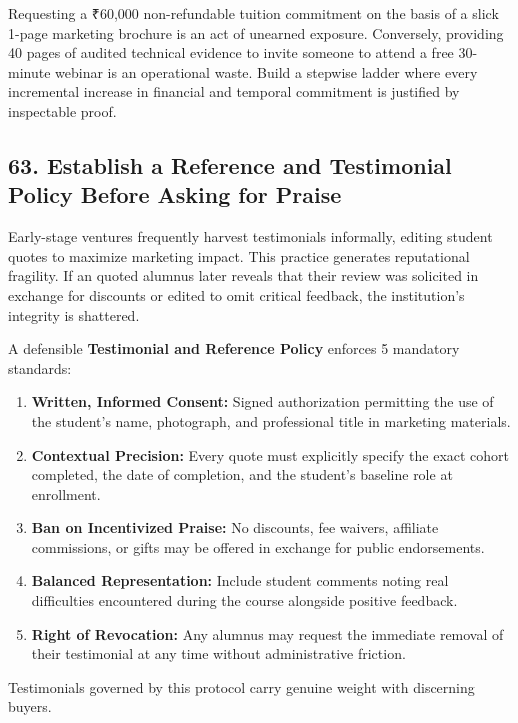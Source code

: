 Requesting a ₹60,000 non-refundable tuition commitment on the basis of a slick 1-page marketing brochure is an act of unearned exposure. Conversely, providing 40 pages of audited technical evidence to invite someone to attend a free 30-minute webinar is an operational waste. Build a stepwise ladder where every incremental increase in financial and temporal commitment is justified by inspectable proof.

\subsection*{63. Establish a Reference and Testimonial Policy Before Asking for Praise}

Early-stage ventures frequently harvest testimonials informally, editing student quotes to maximize marketing impact. This practice generates reputational fragility. If an quoted alumnus later reveals that their review was solicited in exchange for discounts or edited to omit critical feedback, the institution's integrity is shattered.

A defensible \textbf{Testimonial and Reference Policy} enforces 5 mandatory standards:
\begin{enumerate}
\item \textbf{Written, Informed Consent:} Signed authorization permitting the use of the student's name, photograph, and professional title in marketing materials.
\item \textbf{Contextual Precision:} Every quote must explicitly specify the exact cohort completed, the date of completion, and the student's baseline role at enrollment.
\item \textbf{Ban on Incentivized Praise:} No discounts, fee waivers, affiliate commissions, or gifts may be offered in exchange for public endorsements.
\item \textbf{Balanced Representation:} Include student comments noting real difficulties encountered during the course alongside positive feedback.
\item \textbf{Right of Revocation:} Any alumnus may request the immediate removal of their testimonial at any time without administrative friction.
\end{enumerate}

Testimonials governed by this protocol carry genuine weight with discerning buyers.
